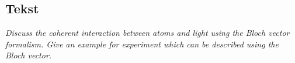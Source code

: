 \subsection{Tekst}

\emph{Discuss the coherent interaction between atoms and light using the Bloch vector formalism. Give an example for experiment which can be described using the Bloch vector.}